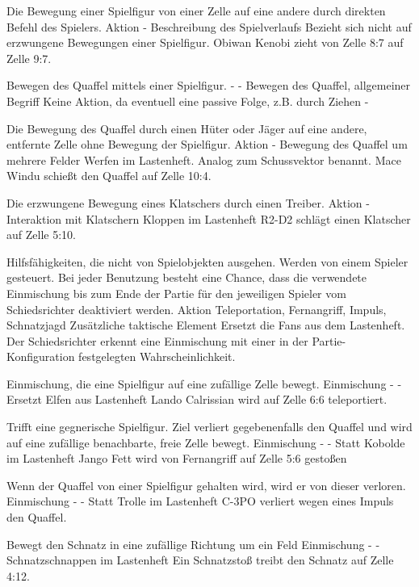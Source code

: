 {Die Bewegung einer Spielfigur von einer Zelle auf eine andere durch direkten Befehl des Spielers.}
{Aktion}
{-}
{Beschreibung des Spielverlaufs}
{Bezieht sich nicht auf erzwungene Bewegungen einer Spielfigur.}
{Obiwan Kenobi zieht von Zelle 8:7 auf Zelle 9:7.}

{Bewegen des Quaffel mittels einer Spielfigur.}
{-}
{-}
{Bewegen des Quaffel, allgemeiner Begriff}
{Keine Aktion, da eventuell eine passive Folge, z.B. durch Ziehen}
{-}

{Die Bewegung des Quaffel durch einen Hüter oder Jäger auf eine andere, entfernte Zelle ohne Bewegung der Spielfigur.}
{Aktion}
{-}
{Bewegung des Quaffel um mehrere Felder}
{\glqq{}Werfen\grqq{}  im Lastenheft. Analog zum Schussvektor benannt.}
{Mace Windu schießt den Quaffel auf Zelle 10:4.}

{Die erzwungene Bewegung eines Klatschers durch einen Treiber.}
{Aktion}
{-}
{Interaktion mit Klatschern}
{\glqq{}Kloppen\grqq{}  im Lastenheft}
{R2-D2 schlägt einen Klatscher auf Zelle 5:10.}

{Hilfsfähigkeiten, die nicht von Spielobjekten ausgehen. Werden von einem Spieler gesteuert. Bei jeder Benutzung besteht eine Chance, dass die verwendete Einmischung bis zum Ende der Partie für den jeweiligen Spieler vom Schiedsrichter deaktiviert werden.}
{Aktion}
{Teleportation, Fernangriff, Impuls, Schnatzjagd}
{Zusätzliche taktische Element}
{Ersetzt die \glqq{}Fans\grqq{}  aus dem Lastenheft.}
{Der Schiedsrichter erkennt eine Einmischung mit einer in der Partie-Konfiguration festgelegten Wahrscheinlichkeit.}

{Einmischung, die eine Spielfigur auf eine zufällige Zelle bewegt.}
{Einmischung}
{-}
{-}
{Ersetzt \glqq{}Elfen\grqq{}  aus Lastenheft}
{Lando Calrissian wird auf Zelle 6:6 teleportiert.}

{Trifft eine gegnerische Spielfigur. Ziel verliert gegebenenfalls den Quaffel und wird auf eine zufällige benachbarte, freie Zelle bewegt.}
{Einmischung}
{-}
{-}
{Statt \glqq{}Kobolde\grqq{}  im Lastenheft}
{Jango Fett wird von Fernangriff auf Zelle 5:6 gestoßen}

{Wenn der Quaffel von einer Spielfigur gehalten wird, wird er von dieser verloren.}
{Einmischung}
{-}
{-}
{Statt \glqq{}Trolle\grqq{}  im Lastenheft}
{C-3PO verliert wegen eines Impuls den Quaffel.}

{Bewegt den Schnatz in eine zufällige Richtung um ein Feld}
{Einmischung}
{-}
{-}
{\glqq{}Schnatzschnappen\grqq{}  im Lastenheft}
{Ein Schnatzstoß treibt den Schnatz auf Zelle 4:12.}

